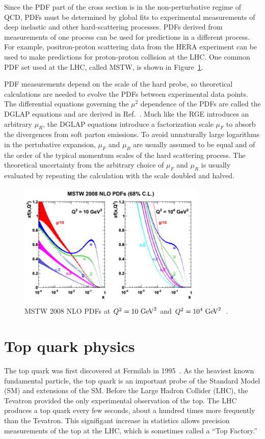 Since the PDF part of the cross section is in the non-perturbative regime of QCD, PDFs must be determined by global fits to experimental measurements of deep inelastic and other hard-scattering processes. PDFs derived from measurements of one process can be used for predictions in a different process. For example, positron-proton scattering data from the HERA experiment can be used to make predictions for proton-proton collision at the LHC. One common PDF set used at the LHC, called MSTW, is shown in Figure~\ref{fig:mstw}.

PDF measurements depend on the scale of the hard probe, so theoretical calculations are needed to evolve the PDFs between experimental data points. The differential equations governing the $\mu^2$ dependence of the PDFs are called the DGLAP equations and are derived in Ref.~\cite{Altarelli:1977zs}. Much like the RGE introduces an arbitrary $\mu_R$, the DGLAP equations introduce a factorization scale $\mu_F$ to absorb the divergences from soft parton emissions. To avoid unnaturally large logarithms in the pertubative expansion,  $\mu_F$ and $\mu_R$ are usually assumed to be equal and of the order of the typical momentum scales of the hard scattering process. The theoretical uncertainty from the arbitrary choice of $\mu_F$ and $\mu_R$ is usually evaluated by repeating the calculation with the scale doubled and halved.
\begin{figure}
\centering
\includegraphics[width=0.8\textwidth]{fig/thry/mstw.png}
\caption{MSTW 2008 NLO PDFs at $Q^2= 10 \gev^2$ and $Q^2= 10^4 \gev^2$~\cite{mstw}.}
\label{fig:mstw}
\end{figure}









\section{Top quark physics}
The top quark was first discovered at Fermilab in 1995~\cite{Abe:1995hr}\cite{Abachi:1995iq}. As the heaviest known fundamental particle, the top quark is an important probe of the Standard Model (SM) and extensions of the SM. Before the Large Hadron Collider (LHC), the Tevatron provided the only experimental observation of the top. The LHC produces a top quark every few seconds, about a hundred times more frequently than the Tevatron. This signifigant increase in statistics allows precision measurements of the top at the LHC, which is sometimes called a ``Top Factory.'' 

